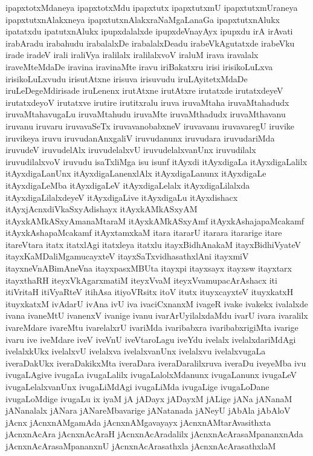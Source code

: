 {ipapxtotxMdaneya
ipapxtotxMdu
ipapxtutx
ipapxtutxmU
ipapxtutxmUraneya
ipapxtutxnAlakxneya
ipapxtutxnAlakxraNaMgaLanaGa
ipapxtutxnAlukx
ipatatxdu
ipatutxnAlukx
ipupxdalalxde
ipupxdeVnayAyx
ipupxdu
irA
irAvati
irabAradu
irabahudu
irabalalxDe
irabalalxDeadu
irabeVkAgutatxde
irabeVku
irade
iradeV
irali
iraliVya
iralilalx
iralilalxvoV
iraluM
irava
iravalalx
iraveMteMdaDe
iravina
iravinaMte
iravu
iriBakatxru
irisi
irisikoLuLxva
irisikoLuLxvudu
irisutAtxne
irisuva
irisuvudu
iruLAyitetxMdaDe
iruLeDegeMdirisade
iruLenenx
irutAtxne
irutAtxre
irutatxde
irutatxdeyeV
irutatxdeyoV
irutatxve
irutire
irutitxralu
iruva
iruvaMtaha
iruvaMtahadudx
iruvaMtahavugaLu
iruvaMtahudu
iruvaMte
iruvaMthadudx
iruvaMthavanu
iruvanu
iruvaru
iruvavaSeTx
iruvavanobabxneV
iruvavanu
iruvavaregU
iruvike
iruvikeya
iruvu
iruvudanAnxgaliV
iruvudanunx
iruvudara
iruvudariMda
iruvudeV
iruvudelAlx
iruvudelalxvU
iruvudelalxvanUnx
iruvudilalx
iruvudilalxvoV
iruvudu
isaTxliMga
isu
isunf
itAyxdi
itAyxdigaLa
itAyxdigaLalilx
itAyxdigaLanUnx
itAyxdigaLanenxlAlx
itAyxdigaLanunx
itAyxdigaLe
itAyxdigaLeMba
itAyxdigaLeV
itAyxdigaLelalx
itAyxdigaLilalxda
itAyxdigaLilalxdeyeV
itAyxdigaLive
itAyxdigaLu
itAyxdishacx
itAyxjAcnxdiVkaSxyAdishayx
itAyxkAMkASxyAM
itAyxkAMkASxyAmanaMtaraM
itAyxkAMkASxyAmf
itAyxkAshajapaMcakamf
itAyxkAshapaMcakamf
itAyxtamxkaM
itara
itararU
itarara
itararige
itare
itareVtara
itatx
itatxlAgi
itatxleya
itatxlu
itayxBidhAnakaM
itayxBidhiVyateV
itayxKaMDaliMgamucayxteV
itayxSaTxvidhasathxlAni
itayxmiV
itayxneVnABimAneVna
itayxpasxMBUta
itayxpi
itayxsayx
itayxsw
itayxtarx
itayxthaRH
iteyxVkAgarxmatiM
iteyxVvaM
iteyxVvamupacArAshacx
iti
itiVritaH
itiVyaRteV
itihAsa
itiyoVRsitx
itoV
itutx
ituyxcayxteV
ituyxkatxH
ituyxkatxM
ivAdarU
ivAna
ivU
iva
ivaciCxnanxM
ivageR
ivake
ivakekx
ivalalxde
ivana
ivaneMtU
ivanenxV
ivanige
ivanu
ivarArUyilalxdaMdu
ivarU
ivara
ivaralilx
ivareMdare
ivareMtu
ivarelalxrU
ivariMda
ivaribabxra
ivaribabxrigiMta
ivarige
ivaru
ive
iveMdare
iveV
iveVnU
iveVtaroLagu
iveYdu
ivelalx
ivelalxdariMdAgi
ivelalxkUkx
ivelalxvU
ivelalxva
ivelalxvanUnx
ivelalxvu
ivelalxvugaLa
iveraDakUkx
iveraDakikxMta
iveraDara
iveraDaralilxruva
iveraDu
iveyeMba
ivu
ivugaLAgive
ivugaLa
ivugaLalilx
ivugaLalolxMdanunx
ivugaLanunx
ivugaLeV
ivugaLelalxvanUnx
ivugaLiMdAgi
ivugaLiMda
ivugaLige
ivugaLoDane
ivugaLoMdige
ivugaLu
ix
iyaM
jA
jADayx
jADayxM
jALige
jANa
jANanaM
jANanalalx
jANara
jANareMbavarige
jANatanada
jANeyU
jAbAla
jAbAloV
jAcnx
jAcnxnAMgamAda
jAcnxnAMgavayayx
jAcnxnAMtarAvasithxta
jAcnxnAcAra
jAcnxnAcAraH
jAcnxnAcAradalilx
jAcnxnAcArasaMpananxnAda
jAcnxnAcArasaMpananxnU
jAcnxnAcArasathxla
jAcnxnAcArasathxlaM
}
